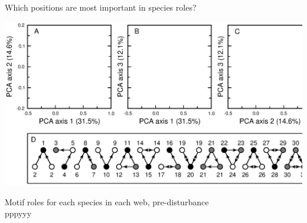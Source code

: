 \documentclass{beamer}
\begin{document}
  \begin{frame}{Which positions are most important in species roles?}
    \begin{centering}
      \includegraphics[width=\textwidth]{../manuscript/figures/roles/roleplot_talk_axis.eps}
    \end{centering}
    
    {\color{DarkBlue}Motif roles for each species in each web, pre-disturbance}\\{\color{white}pppyyy}
    \end{frame}





\end{document}
